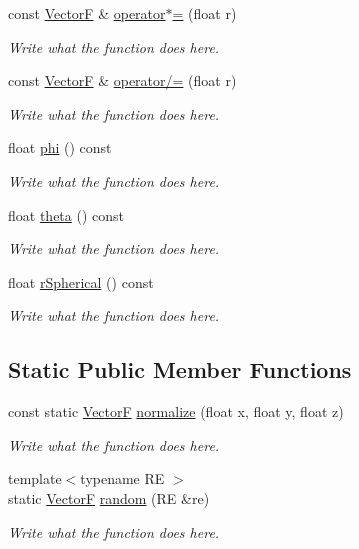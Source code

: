 \begin{DoxyCompactItemize}
const \hyperlink{structVectorF}{Vector\+F} \& \hyperlink{structVectorF_a7eefa6afb0423e0d73b9f44a29941149}{operator$\ast$=} (float r)
\begin{DoxyCompactList}\small\item\em Write what the function does here. \end{DoxyCompactList}\item 
const \hyperlink{structVectorF}{Vector\+F} \& \hyperlink{structVectorF_ae7f9ffcce8e70e05d1f9608425e6a73c}{operator/=} (float r)
\begin{DoxyCompactList}\small\item\em Write what the function does here. \end{DoxyCompactList}\item 
float \hyperlink{structVectorF_a06ad6731ddd2591b29581f25eed20737}{phi} () const 
\begin{DoxyCompactList}\small\item\em Write what the function does here. \end{DoxyCompactList}\item 
float \hyperlink{structVectorF_a057b3c771f25463a76c1c9bc9425e663}{theta} () const 
\begin{DoxyCompactList}\small\item\em Write what the function does here. \end{DoxyCompactList}\item 
float \hyperlink{structVectorF_aabadea23e2330189a4fb35077c849b60}{r\+Spherical} () const 
\begin{DoxyCompactList}\small\item\em Write what the function does here. \end{DoxyCompactList}\end{DoxyCompactItemize}
\subsection*{Static Public Member Functions}
\begin{DoxyCompactItemize}
\item 
const static \hyperlink{structVectorF}{Vector\+F} \hyperlink{structVectorF_a553da195f30b0f0de5d856c80f7348ff}{normalize} (float x, float y, float z)
\begin{DoxyCompactList}\small\item\em Write what the function does here. \end{DoxyCompactList}\item 
{\footnotesize template$<$typename R\+E $>$ }\\static \hyperlink{structVectorF}{Vector\+F} \hyperlink{structVectorF_a4fa271c1382d384676561cc539b9abdb}{random} (R\+E \&re)
\begin{DoxyCompactList}\small\item\em Write what the function does here. \end{DoxyCompactList}\end{DoxyCompactItemize}
